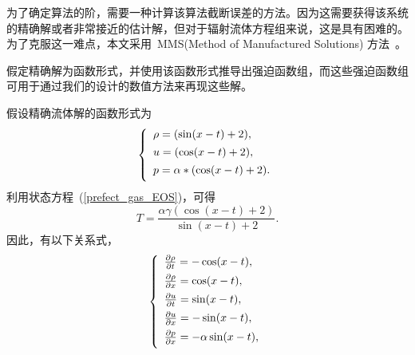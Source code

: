 
\appendix
\setcounter{chapter}{0} \setcounter{section}{0}
\setcounter{figure}{0} \setcounter{table}{0}
\setcounter{equation}{0}
\renewcommand{\thechapter}{\Alph{chapter}}

\renewcommand{\fpath}{./appendix/figures/}
\label{FuluA}
为了确定算法的阶，需要一种计算该算法截断误差的方法。因为这需要获得该系统的精确解或者非常接近的估计解，但对于辐射流体方程组来说，这是具有困难的。为了克服这一难点，本文采用~MMS(Method of Manufactured Solutions) 方法~\cite{2017Second}。

假定精确解为函数形式，并使用该函数形式推导出强迫函数组，而这些强迫函数组可用于通过我们的设计的数值方法来再现这些解。

假设精确流体解的函数形式为
\begin{equation}\label{exact_solution}
\left\{
\begin{array}{lll}
\rho=(\sin(x-t)+2),\vspace{1ex}\\
u=(\cos(x-t)+2),\vspace{1ex}\\
p=\alpha*(\cos(x-t)+2).\vspace{1ex}\\
\end{array}
\right.
\end{equation}
利用状态方程~(\ref{prefect_gas_EOS})，可得
\begin{equation*}\label{exact_solution_T}
T=\frac{\alpha\gamma(\cos(x-t)+2)}{\sin(x-t)+2}.
\end{equation*}
因此，有以下关系式，
\begin{equation*}\label{exact_solution_relationship1}
\left\{
\begin{array}{lllll}
\frac{\partial\rho}{\partial t}=-\cos(x-t),\vspace{1ex}\\
\frac{\partial\rho}{\partial x}=\cos(x-t),\vspace{1ex}\\
\frac{\partial u}{\partial t}=\sin(x-t),\vspace{1ex}\\
\frac{\partial u}{\partial x}=-\sin(x-t),\vspace{1ex}\\
\frac{\partial p}{\partial x}=-\alpha \sin(x-t),\vspace{1ex}\\
\end{array}
\right.
\end{equation*}

